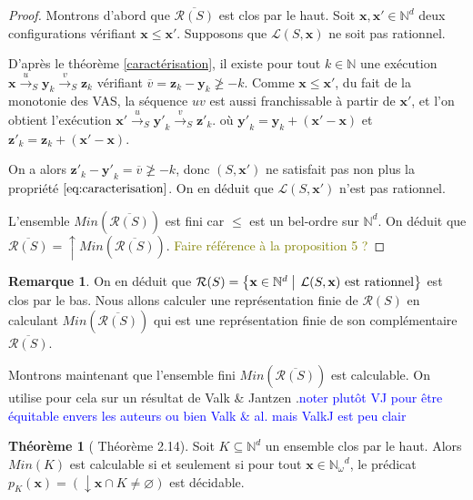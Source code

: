 \documentclass[a4paper,final]{article}
\theoremstyle{definition}
\newtheorem{Theorem}{Théorème}
\newtheorem*{Remark}{Remarque}
\let\leq\leqslant
\let\geq\geqslant
\newcommand{\alain}[1]{\textcolor{blue}{#1}}
\newcommand{\lucas}[1]{\textcolor{olive}{#1}}
\newcommand{\set}[2]{\left\{#1\mathrel{\left|\vphantom{#1}\vphantom{#2}\right.}#2\right\}}
\let\vide\varnothing
\newcommand{\Min}{\textit{Min}}
\newcommand{\N}{\ensuremath{\mathbb{N}}}
\newcommand{\Nomega}{\ensuremath{\mathbb{N}_\omega}}
\newcommand{\lang}{\ensuremath{\mathcal{L}}}
\newcommand{\trans}[2]{\ensuremath{\stackrel{#1}{\longrightarrow}_{#2}}}
\newcommand{\vect}[1]{\ensuremath{\mathbf{#1}}}
\newcommand{\valeur}[1]{\ensuremath{\overline{#1}}}
\newcommand{\inirat}{\mathcal{R}}
\begin{document}

\begin{proof}
Montrons d'abord que $\overline{\inirat(S)}$ est clos par le haut. Soit $\vect{x},\vect{x'}\in\N^d$ deux configurations vérifiant $\vect{x} \leq \vect{x'}$.
Supposons que $\lang(S,\vect{x})$ ne soit pas rationnel.

D'après le théorème \ref{caractérisation}, il existe pour tout $k\in\N$ une exécution $\vect{x} \trans{u}{S} \vect{y}_k \trans{v}{S} \vect{z}_k$ vérifiant $\valeur{v} = \vect{z}_k - \vect{y}_k \not\geq -k$.
Comme $\vect{x}\leq\vect{x'}$, du fait de la monotonie des VAS, la séquence $uv$ est aussi franchissable à partir de $\vect{x'}$, et l'on obtient l'exécution $\vect{x'} \trans{u}{S} \vect{y'}_k \trans{v}{S} \vect{z'}_k$.
où $\vect{y'}_k = \vect{y}_k + (\vect{x'} - \vect{x})$ et $\vect{z'}_k = \vect{z}_k + (\vect{x'} - \vect{x})$.

On a alors $\vect{z'}_k - \vect{y'}_k = \valeur{v} \not\geq -k$, donc $(S,\vect{x'})$ ne satisfait pas non plus la propriété $\eqref{eq:caracterisation}$.
On en déduit que $\lang(S,\vect{x'})$ n'est pas rationnel.

L'ensemble $\Min(\overline{\inirat(S)})$ est fini car $\leq$ est un bel-ordre sur $\N^d$. On déduit que $\overline{\inirat(S)}=\uparrow \Min(\overline{\inirat(S)})$.
\lucas{Faire référence à la proposition 5 ?}
\end{proof}

\begin{Remark}
On en déduit que $\inirat(S) = \set{\vect{x} \in \N^d} {\lang(S,\vect{x}) \text{ est rationnel}}$ est clos par le bas. Nous allons calculer une représentation finie de $\inirat(S)$ en calculant $\Min(\overline{\inirat(S)})$ qui est une représentation finie de son complémentaire $\overline{\inirat(S)}$.
\end{Remark}

Montrons maintenant que l'ensemble fini $\Min(\overline{\inirat(S)})$ est calculable.
On utilise pour cela sur un résultat de Valk \& Jantzen \cite{ValkJ85}.\alain{noter plutôt VJ pour être équitable envers les auteurs ou bien Valk \& al. mais ValkJ est peu clair}

\begin{Theorem}[\cite{ValkJ85} Théorème 2.14]
Soit $K \subseteq \N^d$ un ensemble clos par le haut.
Alors $\Min(K)$ est calculable si et seulement si pour tout $\vect{x} \in \Nomega^d$, le prédicat $p_K(\vect{x}) = (\downarrow \vect{x} \cap K \neq \vide)$ est décidable.
\end{Theorem}
\end{document}
